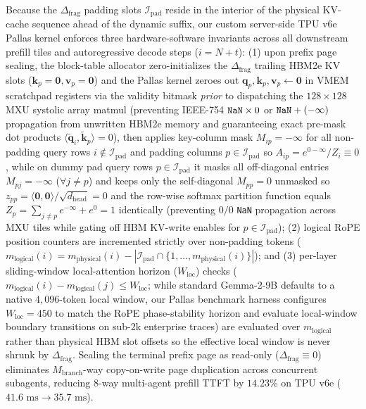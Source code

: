 \documentclass[conference,10pt]{IEEEtran}
\begin{document}
Because the $\Delta_{\text{frag}}$ padding slots $\mathcal{I}_{\text{pad}}$ reside in the interior of the physical KV-cache sequence ahead of the dynamic suffix, our custom server-side TPU v6e Pallas kernel enforces three hardware-software invariants across all downstream prefill tiles and autoregressive decode steps ($i = N + t$): (1) upon prefix page sealing, the block-table allocator zero-initializes the $\Delta_{\text{frag}}$ trailing HBM2e KV slots ($\mathbf{k}_p = \mathbf{0}, \mathbf{v}_p = \mathbf{0}$) and the Pallas kernel zeroes out $\mathbf{q}_p, \mathbf{k}_p, \mathbf{v}_p \leftarrow \mathbf{0}$ in VMEM scratchpad registers via the validity bitmask \textit{prior} to dispatching the $128 \times 128$ MXU systolic array matmul (preventing IEEE-754 $\text{\texttt{NaN}} \times 0$ or $\text{\texttt{NaN}} + (-\infty)$ propagation from unwritten HBM2e memory and guaranteeing exact pre-mask dot products $\langle \tilde{\mathbf{q}}_i, \tilde{\mathbf{k}}_p \rangle = 0$), then applies key-column mask $M_{ip} = -\infty$ for all non-padding query rows $i \notin \mathcal{I}_{\text{pad}}$ and padding columns $p \in \mathcal{I}_{\text{pad}}$ so $A_{ip} = e^{0 - \infty} / Z_i \equiv 0$, while on dummy pad query rows $p \in \mathcal{I}_{\text{pad}}$ it masks all off-diagonal entries $M_{pj} = -\infty$ ($\forall j \neq p$) and keeps only the self-diagonal $M_{pp} = 0$ unmasked so $z_{pp} = \langle \mathbf{0}, \mathbf{0}\rangle / \sqrt{d_{\text{head}}} = 0$ and the row-wise softmax partition function equals $Z_p = \sum_{j \neq p} e^{-\infty} + e^0 = 1$ identically (preventing $0/0$ \texttt{NaN} propagation across MXU tiles while gating off HBM KV-write enables for $p \in \mathcal{I}_{\text{pad}}$); (2) logical RoPE position counters are incremented strictly over non-padding tokens ($m_{\text{logical}}(i) = m_{\text{physical}}(i) - |\mathcal{I}_{\text{pad}} \cap \{1, \dots, m_{\text{physical}}(i)\}|$); and (3) per-layer sliding-window local-attention horizon ($W_{\text{loc}}$) checks ($m_{\text{logical}}(i) - m_{\text{logical}}(j) \le W_{\text{loc}}$; while standard Gemma-2-9B defaults to a native $4{,}096$-token local window, our Pallas benchmark harness configures $W_{\text{loc}} = 450$ to match the RoPE phase-stability horizon and evaluate local-window boundary transitions on sub-2k enterprise traces) are evaluated over $m_{\text{logical}}$ rather than physical HBM slot offsets so the effective local window is never shrunk by $\Delta_{\text{frag}}$. Sealing the terminal prefix page as read-only ($\Delta_{\text{frag}} \equiv 0$) eliminates $M_{\text{branch}}$-way copy-on-write page duplication across concurrent subagents, reducing 8-way multi-agent prefill TTFT by $14.23\%$ on TPU v6e ($41.6\text{ ms} \to 35.7\text{ ms}$).
\end{document}
